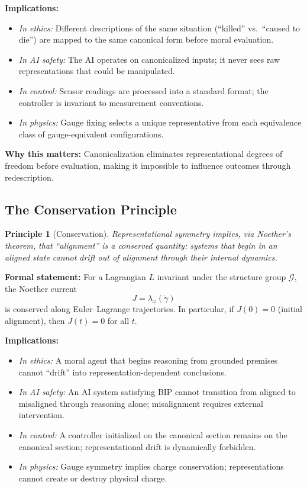 \documentclass[12pt]{article}
\newtheorem{principle}{Principle}
\begin{document}
\textbf{Implications:}
\begin{itemize}
    \item \textit{In ethics:} Different descriptions of the same situation (``killed'' vs.\ ``caused to die'') are mapped to the same canonical form before moral evaluation.

    \item \textit{In AI safety:} The AI operates on canonicalized inputs; it never sees raw representations that could be manipulated.

    \item \textit{In control:} Sensor readings are processed into a standard format; the controller is invariant to measurement conventions.

    \item \textit{In physics:} Gauge fixing selects a unique representative from each equivalence class of gauge-equivalent configurations.
\end{itemize}

\textbf{Why this matters:} Canonicalization eliminates representational degrees of freedom before evaluation, making it impossible to influence outcomes through redescription.

\subsection{The Conservation Principle}

\begin{principle}[Conservation]
\textit{Representational symmetry implies, via Noether's theorem, that ``alignment'' is a conserved quantity: systems that begin in an aligned state cannot drift out of alignment through their internal dynamics.}
\end{principle}

\textbf{Formal statement:} For a Lagrangian $L$ invariant under the structure group $\mathcal{G}$, the Noether current
\[
J = \lambda_\omega(\dot{\gamma})
\]
is conserved along Euler--Lagrange trajectories. In particular, if $J(0) = 0$ (initial alignment), then $J(t) = 0$ for all $t$.

\textbf{Implications:}
\begin{itemize}
    \item \textit{In ethics:} A moral agent that begins reasoning from grounded premises cannot ``drift'' into representation-dependent conclusions.

    \item \textit{In AI safety:} An AI system satisfying BIP cannot transition from aligned to misaligned through reasoning alone; misalignment requires external intervention.

    \item \textit{In control:} A controller initialized on the canonical section remains on the canonical section; representational drift is dynamically forbidden.

    \item \textit{In physics:} Gauge symmetry implies charge conservation; representations cannot create or destroy physical charge.
\end{itemize}
\end{document}
